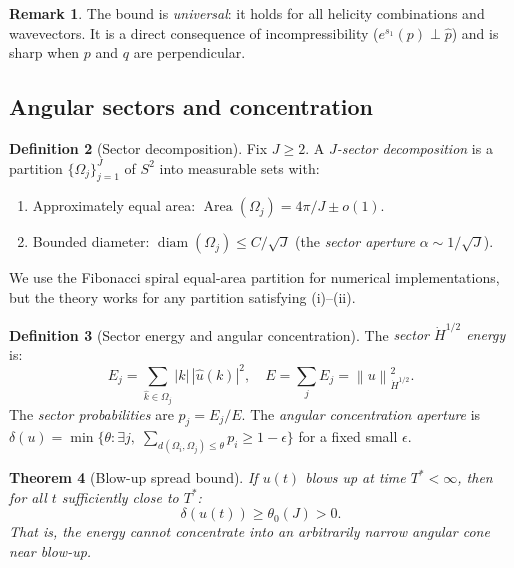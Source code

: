 \documentclass[11pt]{article}
\newtheorem{theorem}{Theorem}[section]
\theoremstyle{definition}
\newtheorem{definition}[theorem]{Definition}
\newtheorem{remark}[theorem]{Remark}
\newcommand{\norm}[1]{\left\| #1 \right\|}
\newcommand{\Hdot}[1]{\dot{H}^{#1}}
\DeclareMathOperator{\Area}{Area}
\DeclareMathOperator{\diam}{diam}
\begin{document}
\begin{remark}
The bound is \emph{universal}: it holds for all helicity
combinations and wavevectors.  It is a direct consequence
of incompressibility ($e^{s_1}(p) \perp \hat{p}$) and is
sharp when $p$ and $q$ are perpendicular.
\end{remark}


\subsection{Angular sectors and concentration}

\begin{definition}[Sector decomposition]
\label{def:sectors}
Fix $J \geq 2$.  A \emph{$J$-sector decomposition} is a
partition $\{\Omega_j\}_{j=1}^J$ of $S^2$ into measurable
sets with:
\begin{enumerate}[label=(\roman*)]
\item Approximately equal area:
$\Area(\Omega_j) = 4\pi/J \pm o(1)$.
\item Bounded diameter: $\diam(\Omega_j) \leq C/\sqrt{J}$
(the \emph{sector aperture} $\alpha \sim 1/\sqrt{J}$).
\end{enumerate}
\end{definition}

We use the Fibonacci spiral equal-area partition for
numerical implementations, but the theory works for any
partition satisfying (i)--(ii).

\begin{definition}[Sector energy and angular concentration]
\label{def:sector-energy}
The \emph{sector $\Hdot{1/2}$ energy} is:
\begin{equation}
E_j = \sum_{\hat{k}\in\Omega_j} |k|\,|\hat{u}(k)|^2,
\quad E = \sum_j E_j = \norm{u}_{\Hdot{1/2}}^2.
\end{equation}
The \emph{sector probabilities} are $p_j = E_j/E$.
The \emph{angular concentration aperture} is
$\delta(u) = \min\{\theta : \exists j,\;
\sum_{d(\Omega_i,\Omega_j)\leq\theta} p_i \geq 1-\epsilon\}$
for a fixed small $\epsilon$.
\end{definition}

\begin{theorem}[Blow-up spread bound]
\label{thm:spread-bound}
If $u(t)$ blows up at time $T^* < \infty$, then for all
$t$ sufficiently close to $T^*$:
\begin{equation}\label{eq:spread}
\delta(u(t)) \geq \theta_0(J) > 0.
\end{equation}
That is, the energy cannot concentrate into an arbitrarily
narrow angular cone near blow-up.
\end{theorem}
\end{document}
